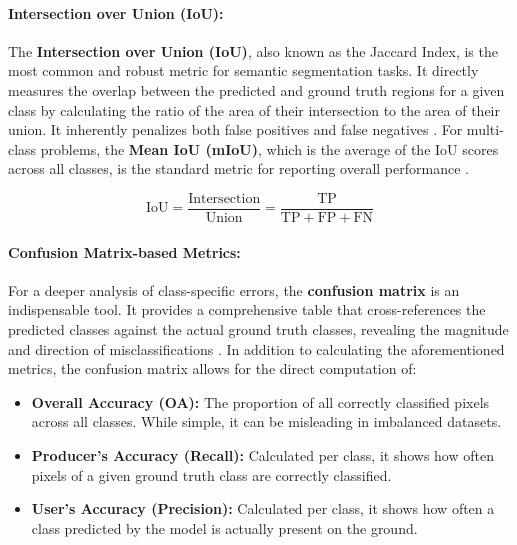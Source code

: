 \documentclass{report}
\begin{document}
\paragraph{Intersection over Union (IoU):}
The \textbf{Intersection over Union (IoU)}, also known as the Jaccard Index, is the most common and robust metric for semantic segmentation tasks. It directly measures the overlap between the predicted and ground truth regions for a given class by calculating the ratio of the area of their intersection to the area of their union. It inherently penalizes both false positives and false negatives \parencites[p.~149;]{LeiEtAlDeeplearningimplementationimagesegmentationagriculturalapplicationscomprehensivereview2024}[p.~9]{SertelEtAlLandUseLandCoverMappingUsingDeepLearningBasedSegmentationApproachesVHRWorldview3Images2022}. For multi-class problems, the \textbf{Mean IoU (mIoU)}, which is the average of the IoU scores across all classes, is the standard metric for reporting overall performance \parencites[p.~149]{LeiEtAlDeeplearningimplementationimagesegmentationagriculturalapplicationscomprehensivereview2024}[p.~3.]{RezatofighiEtAlGeneralizedIntersectionUnionMetricLossBoundingBoxRegression2019}.

\begin{equation}
\text{IoU} = \frac{\text{Intersection}}{\text{Union}} = \frac{\text{TP}}{\text{TP} + \text{FP} + \text{FN}}
\label{eq:IoU}
\end{equation}


\paragraph{Confusion Matrix-based Metrics:}
For a deeper analysis of class-specific errors, the \textbf{confusion matrix} is an indispensable tool. It provides a comprehensive table that cross-references the predicted classes against the actual ground truth classes, revealing the magnitude and direction of misclassifications \parencite[p.~8f.]{SertelEtAlLandUseLandCoverMappingUsingDeepLearningBasedSegmentationApproachesVHRWorldview3Images2022}. In addition to calculating the aforementioned metrics, the confusion matrix allows for the direct computation of:
\begin{itemize}
\item \textbf{Overall Accuracy (OA):} The proportion of all correctly classified pixels across all classes. While simple, it can be misleading in imbalanced datasets.
\item \textbf{Producer's Accuracy (Recall):} Calculated per class, it shows how often pixels of a given ground truth class are correctly classified.
\item \textbf{User's Accuracy (Precision):} Calculated per class, it shows how often a class predicted by the model is actually present on the ground.
\end{itemize}
\end{document}
